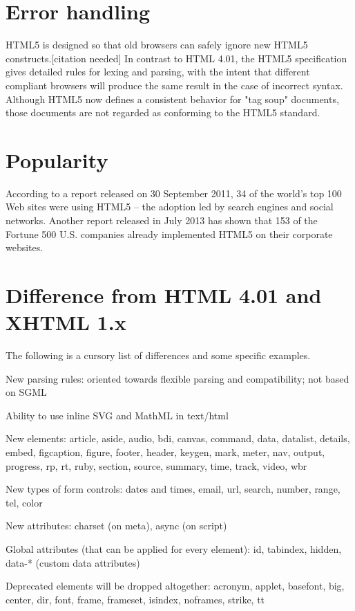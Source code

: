 \section{Error handling}

HTML5 is designed so that old browsers can safely ignore new HTML5 constructs.[citation needed] In contrast to HTML 4.01, the HTML5 specification gives detailed rules for lexing and parsing, with the intent that different compliant browsers will produce the same result in the case of incorrect syntax. Although HTML5 now defines a consistent behavior for "tag soup" documents, those documents are not regarded as conforming to the HTML5 standard.


\section{Popularity}

According to a report released on 30 September 2011, 34 of the world's top 100 Web sites were using HTML5 – the adoption led by search engines and social networks. Another report released in July 2013 has shown that 153 of the Fortune 500 U.S. companies already implemented HTML5 on their corporate websites.



\section{Difference from HTML 4.01 and XHTML 1.x}


The following is a cursory list of differences and some specific examples.

\begin{compactitem}
\item New parsing rules: oriented towards flexible parsing and compatibility; not based on SGML
\item Ability to use inline SVG and MathML in text/html
\item New elements: article, aside, audio, bdi, canvas, command, data, datalist, details, embed, figcaption, figure, footer, header, keygen, mark, meter, nav, output, progress, rp, rt, ruby, section, source, summary, time, track, video, wbr
\item New types of form controls: dates and times, email, url, search, number, range, tel, color
\item New attributes: charset (on meta), async (on script)
\item Global attributes (that can be applied for every element): id, tabindex, hidden, data-* (custom data attributes)
\item Deprecated elements will be dropped altogether: acronym, applet, basefont, big, center, dir, font, frame, frameset, isindex, noframes, strike, tt
\end{compactitem}

